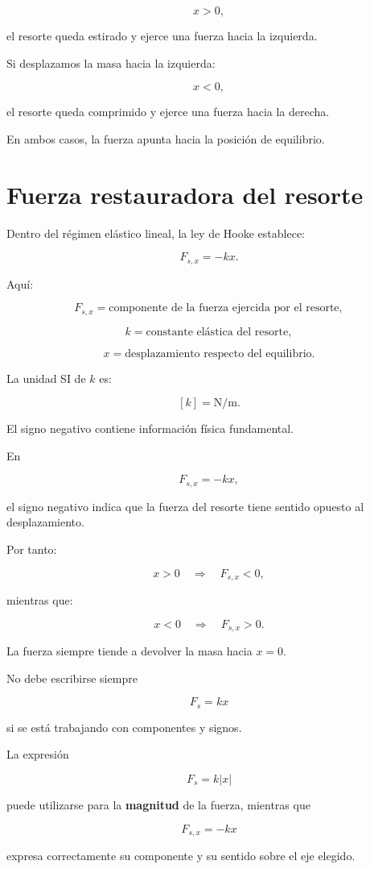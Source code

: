 \[ x>0, \]

el resorte queda estirado y ejerce una fuerza hacia la izquierda.

Si desplazamos la masa hacia la izquierda:

\[ x<0, \]

el resorte queda comprimido y ejerce una fuerza hacia la derecha.

En ambos casos, la fuerza apunta hacia la posición de equilibrio.


\section{Fuerza restauradora del resorte}

Dentro del régimen elástico lineal, la ley de Hooke establece:

\[ \boxed{F_{s,x}=-kx}. \]

Aquí:

\[
F_{s,x}=\text{componente de la fuerza ejercida por el resorte},
\]

\[
k=\text{constante elástica del resorte},
\]

\[
x=\text{desplazamiento respecto del equilibrio}.
\]

La unidad SI de \(k\) es:

\[ [k]=\si{\newton\per\meter}. \]

El signo negativo contiene información física fundamental.

\begin{interpretacion}
En

\[ F_{s,x}=-kx, \]

el signo negativo indica que la fuerza del resorte tiene sentido opuesto al desplazamiento.

Por tanto:

\[
x>0
\quad\Longrightarrow\quad
F_{s,x}<0,
\]

mientras que:

\[
x<0
\quad\Longrightarrow\quad
F_{s,x}>0.
\]

La fuerza siempre tiende a devolver la masa hacia \(x=0\).
\end{interpretacion}

\begin{advertencia}
No debe escribirse siempre

\[ F_s=kx \]

si se está trabajando con componentes y signos.

La expresión

\[ F_s=k|x| \]

puede utilizarse para la \textbf{magnitud} de la fuerza, mientras que

\[ F_{s,x}=-kx \]

expresa correctamente su componente y su sentido sobre el eje elegido.
\end{advertencia}


